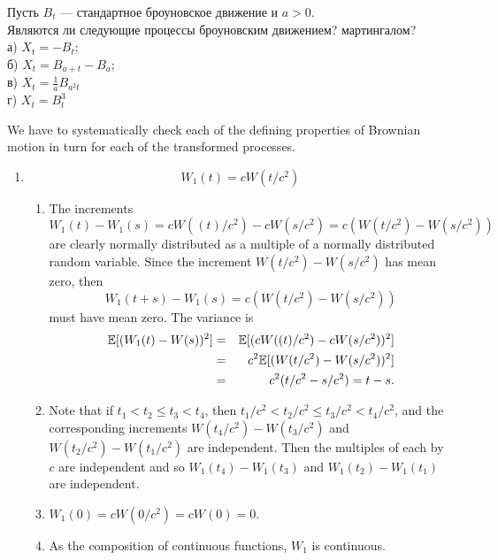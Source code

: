 \begin{problem}
Пусть $B_{t}$ --- стандартное броуновское движение и $a>0$. \\
Являются ли следующие процессы броуновским движением? мартингалом? \\
а) $X_{t}=-B_{t}$; \\
б) $X_{t}=B_{a+t}-B_{a}$; \\
в) $X_{t}=\frac{1}{a}B_{a^{2}t}$ \\ 
г) $X_{t}=B_{t}^{3}$ 
\end{problem} 
\begin{solution} 

We have to systematically check each of the defining properties
of Brownian motion in turn for each of the transformed processes.
\begin{enumerate}
  \item
    \[
      W_1(t) = cW(t/c^2)
    \]
    \begin{enumerate}
       \item
       The increments
       \[
         W_1(t) - W_1(s) = cW( (t)/c^2 ) - cW(s/c^2) = c
         ( W( t/c^2  ) - W( s/c^2 ))
       \]
       are clearly normally distributed as a multiple of a
       normally distributed random variable.  Since the
       increment $ W( t/c^2 ) - W( s/c^2 ) $ has
       mean zero, then
       \[
         W_1(t+s) - W_1(s) = c ( W( t/c^2 ) - W( s/c^2
         ))
       \]
       must have mean zero.  The variance is
       \begin{eqnarray*}
         \mathbb{E}[(W_1(t)-W(s))^2] &=& \mathbb{E}[(c W((t)/c^2) - c W(s/c^2))^2]
         \\
         &=& c^2 \mathbb{E}[ (W( t/c^2 ) - W(s/c^2))^2] \\
         &=& c^2 (t/c^2 - s/c^2) = t - s.
       \end{eqnarray*}

       \item
       Note that if $ t_1 < t_2 \le t_3 < t_4 $, then $ t_1/c^2
       < t_2/c^2 \le t_3/c^2 < t_4/c^2 $, and the corresponding
       increments $ W(t_4/c^2) - W(t_3/c^2) $ and $ W(t_2/c^2)
       - W(t_1/c^2) $ are independent.  Then the multiples of
       each by $ c $ are independent and so $ W_1(t_4) - W_1(t_3)
       $ and $ W_1(t_2) - W_1(t_1) $ are independent.

       \item
       $ W_1(0) = c W(0/c^2) = c W(0) = 0 $.
       
       \item
       As the composition of continuous functions, $ W_1 $ is
       continuous.
    \end{enumerate}


\end{enumerate}
\end{solution}
